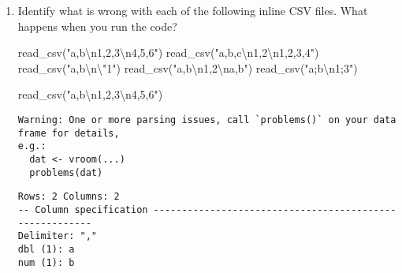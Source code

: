 \documentclass[
  letterpaper,
  DIV=11,
  numbers=noendperiod]{scrreprt}
\newenvironment{Shaded}{\begin{snugshade}}{\end{snugshade}}
\newcommand{\FunctionTok}[1]{\textcolor[rgb]{0.28,0.35,0.67}{#1}}
\newcommand{\NormalTok}[1]{\textcolor[rgb]{0.00,0.23,0.31}{#1}}
\newcommand{\SpecialCharTok}[1]{\textcolor[rgb]{0.37,0.37,0.37}{#1}}
\newcommand{\StringTok}[1]{\textcolor[rgb]{0.13,0.47,0.30}{#1}}
\begin{document}
\begin{enumerate}
\begin{tcolorbox}
  \end{tcolorbox}
\item
  Identify what is wrong with each of the following inline CSV files.
  What happens when you run the code?

\begin{Shaded}
\begin{Highlighting}[]
\FunctionTok{read\_csv}\NormalTok{(}\StringTok{"a,b}\SpecialCharTok{\textbackslash{}n}\StringTok{1,2,3}\SpecialCharTok{\textbackslash{}n}\StringTok{4,5,6"}\NormalTok{)}
\FunctionTok{read\_csv}\NormalTok{(}\StringTok{"a,b,c}\SpecialCharTok{\textbackslash{}n}\StringTok{1,2}\SpecialCharTok{\textbackslash{}n}\StringTok{1,2,3,4"}\NormalTok{)}
\FunctionTok{read\_csv}\NormalTok{(}\StringTok{"a,b}\SpecialCharTok{\textbackslash{}n\textbackslash{}"}\StringTok{1"}\NormalTok{)}
\FunctionTok{read\_csv}\NormalTok{(}\StringTok{"a,b}\SpecialCharTok{\textbackslash{}n}\StringTok{1,2}\SpecialCharTok{\textbackslash{}n}\StringTok{a,b"}\NormalTok{)}
\FunctionTok{read\_csv}\NormalTok{(}\StringTok{"a;b}\SpecialCharTok{\textbackslash{}n}\StringTok{1;3"}\NormalTok{)}
\end{Highlighting}
\end{Shaded}

  \begin{tcolorbox}[enhanced jigsaw, left=2mm, rightrule=.15mm, bottomtitle=1mm, opacitybacktitle=0.6, leftrule=.75mm, opacityback=0, colframe=quarto-callout-note-color-frame, bottomrule=.15mm, coltitle=black, toptitle=1mm, colback=white, titlerule=0mm, colbacktitle=quarto-callout-note-color!10!white, title={Answer}, toprule=.15mm, breakable, arc=.35mm]

\begin{Shaded}
\begin{Highlighting}[]
\FunctionTok{read\_csv}\NormalTok{(}\StringTok{"a,b}\SpecialCharTok{\textbackslash{}n}\StringTok{1,2,3}\SpecialCharTok{\textbackslash{}n}\StringTok{4,5,6"}\NormalTok{)}
\end{Highlighting}
\end{Shaded}

\begin{verbatim}
Warning: One or more parsing issues, call `problems()` on your data frame for details,
e.g.:
  dat <- vroom(...)
  problems(dat)
\end{verbatim}

\begin{verbatim}
Rows: 2 Columns: 2
-- Column specification --------------------------------------------------------
Delimiter: ","
dbl (1): a
num (1): b


\end{verbatim}
\end{tcolorbox}
\end{enumerate}
\end{document}
